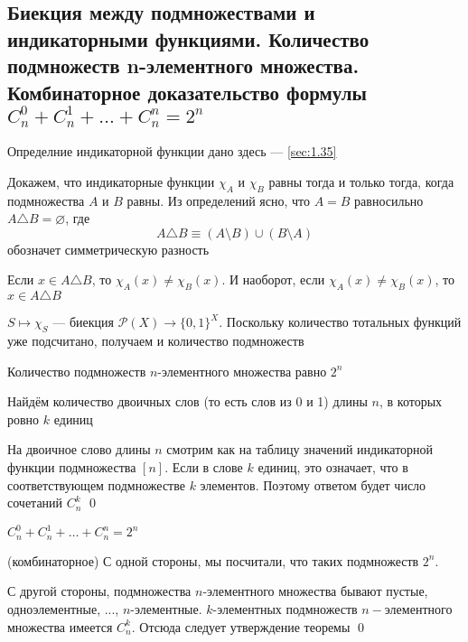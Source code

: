 \documentclass[a4paper]{article}
\begin{document}
\subsection{Биекция между подмножествами и индикаторными функциями. Количество подмножеств n-элементного множества. Комбинаторное доказательство формулы $C^0_n+C^1_n+\ldots+C^n_n=2^n$}
Определние индикаторной функции дано здесь —  \ref{sec:1.35}

\proof Докажем, что индикаторные функции $\chi_A$ и $\chi_B$ равны тогда и только тогда, когда подмножества $A$ и $B$ равны. Из определений ясно, что $A = B$ равносильно $A\triangle B=\varnothing$, где
\begin{equation*}
    A\triangle B\equiv(A\setminus B)\cup(B\setminus A)
\end{equation*}
обозначет симметрическую разность

Если $x\in A\triangle B$, то $\chi_A(x)\ne\chi_B(x)$. И наоборот, если $\chi_A(x)\ne\chi_B(x)$, то $x\in A\triangle B$

$S\mapsto\chi_S$ — биекция $\mathcal{P}(X)\rightarrow\{0,1\}^X$. Поскольку количество тотальных функций уже подсчитано, получаем и количество подмножеств

\theorem Количество подмножеств $n$-элементного множества равно $2^n$

\proof Найдём количество двоичных слов (то есть слов из 0 и 1) длины $n$, в которых ровно $k$ единиц

На двоичное слово длины $n$ смотрим как на таблицу значений индикаторной функции подмножества $[n]$. Если в слове $k$ единиц, это означает, что в соответствующем подмножестве $k$ элементов. Поэтому ответом будет число сочетаний $C_n^k$ \qed

\theorem $C^0_n+C^1_n+\ldots+C^n_n=2^n$

\proof (комбинаторное) С одной стороны, мы посчитали, что таких подмножеств $2^n$. 

С другой стороны, подмножества $n$-элементного множества бывают пустые, одноэлементные, ..., $n$-элементные. $k$-элементных подмножеств $n-$элементного множества имеется $C_n^k$. Отсюда следует утверждение теоремы \qed
\end{document}
